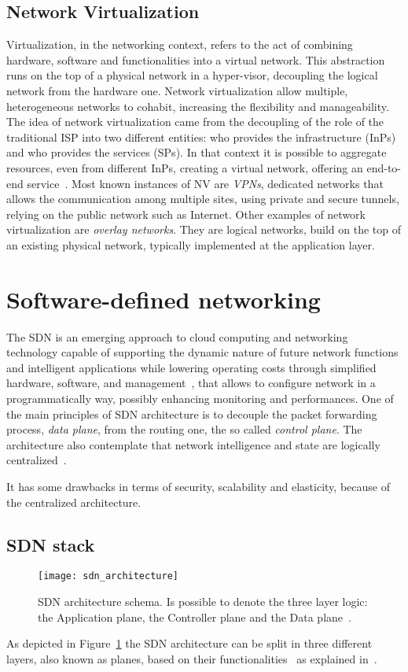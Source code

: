 \subsection{Network Virtualization}
Virtualization, in the networking context, refers to the act of combining
hardware, software and functionalities into a virtual network. This abstraction
runs on the top of a physical network in a hyper-visor, decoupling the logical
network from the hardware one. Network virtualization allow multiple,
heterogeneous networks to cohabit, increasing the flexibility and manageability.
The idea of network virtualization came from the decoupling of the role of the
traditional ISP into two different entities: who provides the infrastructure
(InPs) and who provides the services (SPs). In that context it is possible to
aggregate resources, even from different InPs, creating a virtual network,
offering an end-to-end service~\cite{chowdhury2009network}. Most known instances
of NV are \emph{VPNs}, dedicated networks that allows the communication among
multiple sites, using private and secure tunnels, relying on the public network
such as Internet. Other examples of network virtualization are \emph{overlay
  networks}. They are logical networks, build on the top of an existing physical
network, typically implemented at the application layer.

\section{Software-defined networking}
The SDN is an emerging approach to cloud computing and networking technology
capable of supporting the dynamic nature of future network functions and
intelligent applications while lowering operating costs through simplified
hardware, software, and management~\cite{sezer2013we}, that allows to configure
network in a programmatically way, possibly enhancing monitoring and
performances. One of the main principles of SDN architecture is to decouple the
packet forwarding process, \emph{data plane}, from the routing one, the so
called \emph{control plane}. The architecture also contemplate that network
intelligence and state are logically centralized~\cite{fundation2012software}. 

It has some drawbacks in terms of security, scalability and elasticity, because
of the centralized architecture.

\subsection{SDN stack}
\begin{figure}[ht]
 \centering
 \texttt{[image: sdn\_architecture]}
 \caption[SDN architecture schema]{SDN architecture schema. Is possible to 
denote the three layer logic: the Application plane, the Controller plane and 
the Data plane~\cite{fundation2013software}.}
 \label{chap:background:img:sdn_architecture}
\end{figure}
As depicted in Figure~\ref{chap:background:img:sdn_architecture} the SDN
architecture can be split in three different layers, also known as planes,
based on their functionalities~\cite{fundation2012software} as explained
in~\cite{fundation2013software}.

